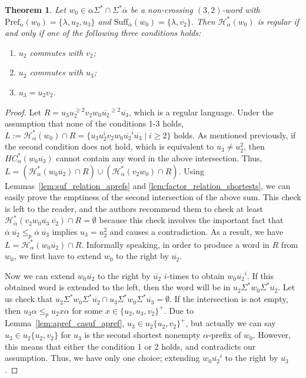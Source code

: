 \documentclass{article}
\theoremstyle{plain}
\newtheorem{theorem}{Theorem}
\theoremstyle{remark}
\newcommand{\HC}{\ensuremath{\mathcal{H}}}
\newcommand{\Pref}{\ensuremath{\mathrm{Pref}}}
\newcommand{\Suff}{\ensuremath{\mathrm{Suff}}}
\newcommand{\calpha}{\ensuremath{\overline{\alpha}}}
\begin{document}
\begin{theorem}\label{thm:32nonx_iff_regular}
	Let $w_0 \in \alpha \Sigma^* \cap \Sigma^* \calpha$ be a non-crossing $(3, 2)$-word with $\Pref_\alpha(w_0) = \{\lambda, u_2, u_3\}$ and $\Suff_{\calpha}(w_0) = \{\lambda, \overline{v_2}\}$. 
	Then $\HC_\alpha^*(w_0)$ is regular if and only if one of the following three conditions holds: 
	\begin{enumerate}
	\item	$u_2$ commutes with $v_2$; 
	\item	$u_2$ commutes with $u_3$; 
	\item	$u_3 = u_2 v_2$. 
	\end{enumerate}
\end{theorem}
\begin{proof}
	Let $R = u_3u_2^{\ge 2} v_2 w_0 \overline{u_2}^{\ge 2} \overline{u_3}$, which is a regular language. 
	Under the assumption that none of the conditions 1-3 holds, $L := \HC_\alpha^*(w_0) \cap R = \{u_3u_2^i v_2 w_0 \overline{u_2}^i \overline{u_3} \mid i \ge 2\}$ holds.
	As mentioned previously, if the second condition does not hold, which is equivalent to $u_3 \neq u_2^2$, then $HC_\alpha^*(w_0 \overline{u_3})$ cannot contain any word in the above intersection. 
	Thus, $L = (\HC_\alpha^*(w_0 \overline{u_2}) \cap R) \cup (\HC_\alpha^*(v_2 w_0) \cap R)$. 
	Using Lemmas~\ref{lem:suf_relation_aprefs} and \ref{lem:factor_relation_shortests}, we can easily prove the emptiness of the second intersection of the above sum. 
	This check is left to the reader, and the authors recommend them to check at least $\HC_\alpha^*(v_2 w_0 \overline{u_3} \ \overline{v_2}) \cap R = \emptyset$ because this check involves the important fact that $\calpha \ \overline{u_2} \le_p \calpha \ \overline{u_3}$ implies $u_3 = u_2^2$ and causes a contradiction. 
	As a result, we have $L = \HC_\alpha^*(w_0 \overline{u_2}) \cap R$. 
	Informally speaking, in order to produce a word in $R$ from $w_0$, we first have to extend $w_0$ to the right by $\overline{u_2}$. 

	Now we can extend $w_0 \overline{u_2}$ to the right by $\overline{u_2}$ $i$-times to obtain $w_0 \overline{u_2}^i$. 
	If this obtained word is extended to the left, then the word will be in $u_2 \Sigma^* w_0 \Sigma^* \overline{u_2}$. 
	Let us check that $u_2 \Sigma^* w_0 \Sigma^* \overline{u_2} \cap u_3 \Sigma^* w_0 \Sigma^* \overline{u_3} = \emptyset$. 
	If the intersection is not empty, then $u_3 \alpha \le_p u_2 x \alpha$ for some $x \in \{u_2, u_3, v_2\}^+$. 
	Due to Lemma~\ref{lem:apref_casuf_apref}, $u_3 \in u_2 \{u_2, v_2\}^+$, but actually we can say $u_3 \in u_2 \{u_2, v_2\}$ for $u_3$ is the second shortest nonempty $\alpha$-prefix of $w_0$. 
	However, this means that either the condition 1 or 2 holds, and contradicts our assumption. 
	Thus, we have only one choice; extending $w_0 \overline{u_2}^i$ to the right by $\overline{u_3}$. 


\end{proof}
\end{document}
